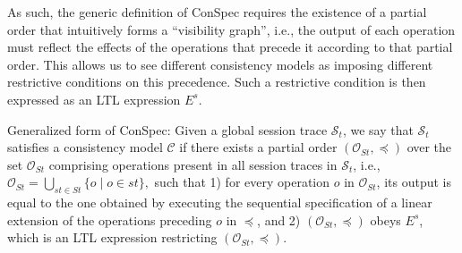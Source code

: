 \documentclass[journal,compsoc]{IEEEtran}
\begin{document}
As such, the generic definition of ConSpec requires the existence of a partial order that intuitively forms a ``visibility graph'', i.e., the output of each operation must reflect the effects of the operations that precede it according to that partial order. This allows us to see different consistency models as imposing different restrictive conditions on this precedence.
 Such a
  restrictive condition is then expressed as an LTL expression $E^s$. 
 \begin{definition}{Generalized form of ConSpec:}\label{def:form0}
Given a global session trace $\mathcal{S}_t$,
we say  that $\mathcal{S}_t$ satisfies a consistency model $\mathcal{C}$
if there exists a partial order $\left( {\mathcal{O}_{St}}, \preccurlyeq \right)$ over the set ${\mathcal{O}_{St}}$ comprising operations  present in all session traces in $\mathcal{S}_t$, i.e.,  ${\mathcal{O}_{St}} = \bigcup_{st \in St} \{ o \mid o \in st \},$  
 such that 1) for every operation $\mathit{o}$ in  ${\mathcal{O}_{St}}$, %
  its output is equal to the one obtained by executing the sequential specification of a linear extension of the operations preceding $\mathit{o}$ in $\preccurlyeq$,
 and 2) $\left( {\mathcal{O}_{St}}, \preccurlyeq \right)$ obeys $E^s$, which is an LTL expression restricting $\left( {\mathcal{O}_{St}}, \preccurlyeq \right)$.
\end{definition}

\end{document}
